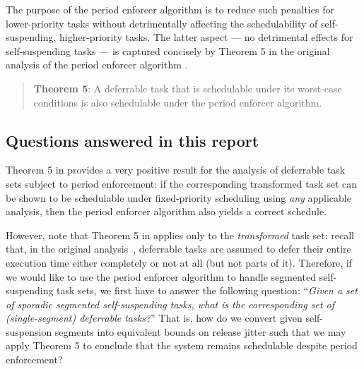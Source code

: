 The purpose of the period enforcer algorithm is to reduce such penalties for lower-priority tasks without detrimentally affecting the schedulability of self-suspending, higher-priority tasks. The latter aspect --- no detrimental effects for self-suspending tasks --- is captured concisely by Theorem 5 in the original analysis of the period enforcer algorithm \cite{Raj:suspension1991}.
\begin{quote}
{\bf Theorem 5}: A deferrable task that is schedulable under its worst-case conditions is also schedulable under the period enforcer algorithm.  \cite{Raj:suspension1991}
\end{quote}

\subsection{Questions answered in this report}

Theorem 5 in \cite{Raj:suspension1991} provides a very positive result for the analysis of deferrable task sets subject to period enforcement: if the corresponding transformed task set can be shown to be schedulable under fixed-priority scheduling using \emph{any} applicable analysis, then the period enforcer algorithm also yields a correct schedule. 

However, note that Theorem 5 in \cite{Raj:suspension1991} applies only to the \emph{transformed} task set: recall that, in the original analysis~\cite{Raj:suspension1991}, deferrable tasks are assumed to defer their entire execution time either completely or not at all (but not parts of it).  Therefore, if we would like to use the period enforcer algorithm to handle segmented self-suspending task sets, we first have to answer the following question: ``\emph{Given a set of sporadic segmented self-suspending tasks, what is the corresponding set of (single-segment) deferrable tasks?}'' That is, how do we convert given self-suspension segments into equivalent bounds on release jitter such that we may apply Theorem 5 to conclude that the system remains schedulable despite period enforcement? 




